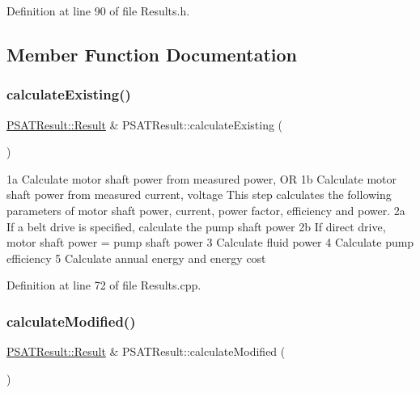 Definition at line 90 of file Results.\+h.



\subsection{Member Function Documentation}
\mbox{\label{class_p_s_a_t_result_a83e8e621cdd75e6cf2a4d3f6e48bea11}} 
\subsubsection{\texorpdfstring{calculate\+Existing()}{calculateExisting()}}
{\footnotesize\ttfamily \hyperlink{struct_p_s_a_t_result_1_1_result}{P\+S\+A\+T\+Result\+::\+Result} \& P\+S\+A\+T\+Result\+::calculate\+Existing (\begin{DoxyParamCaption}{ }\end{DoxyParamCaption})}

1a Calculate motor shaft power from measured power, OR 1b Calculate motor shaft power from measured current, voltage This step calculates the following parameters of motor shaft power, current, power factor, efficiency and power. 2a If a belt drive is specified, calculate the pump shaft power 2b If direct drive, motor shaft power = pump shaft power 3 Calculate fluid power 4 Calculate pump efficiency 5 Calculate annual energy and energy cost

Definition at line 72 of file Results.\+cpp.

\mbox{\label{class_p_s_a_t_result_a1404ffd1e9420afd3ff4e9284d145646}} 
\subsubsection{\texorpdfstring{calculate\+Modified()}{calculateModified()}}
{\footnotesize\ttfamily \hyperlink{struct_p_s_a_t_result_1_1_result}{P\+S\+A\+T\+Result\+::\+Result} \& P\+S\+A\+T\+Result\+::calculate\+Modified (\begin{DoxyParamCaption}{ }\end{DoxyParamCaption})}

